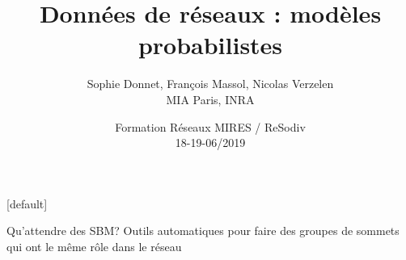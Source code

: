 \documentclass[compress,10pt]{beamer}
\title[Formation Réseaux 06/2019]{ Données de réseaux : modèles probabilistes }
\author[Donnet, Massol, Verzelen]{ Sophie Donnet, François Massol, Nicolas Verzelen\\ MIA Paris, INRA}
\date{Formation Réseaux MIRES / ReSodiv\\ 18-19-06/2019}
\begin{document}
\begin{frame}
\titlepage
\end{frame}

[default]



\begin{frame}{Qu'attendre des SBM? }
 Outils automatiques pour faire des groupes de sommets qui ont le même rôle dans le réseau 
 
\begin{overlayarea}{10cm}{20cm}




\end{overlayarea}
\end{frame}
\end{document}
